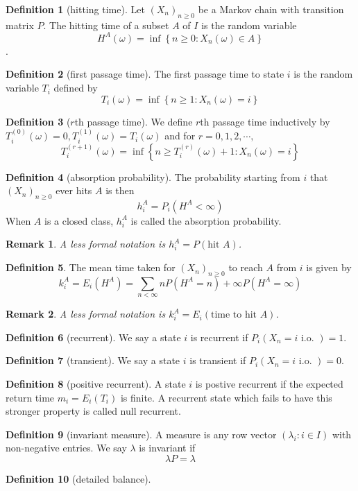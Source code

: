 \documentclass{article}
\newtheorem*{Rk}{Remark}
\theoremstyle{definition}
\newtheorem{Def}{Definition}[section]
\renewcommand{\geq}{\geqslant}
\newcommand{\<}{\left\langle}
\renewcommand{\>}{\right\rangle}
\begin{document}
\begin{Def}[hitting time]
    Let $(X_n)_{n\geq 0}$ be a Markov chain with transition matrix $P$. The hitting time of a subset $A$ of $I$ is the random
    variable \[H^A(\omega)=\inf \left\{n\geq 0:X_n(\omega)\in A\right\}\].
\end{Def}
\begin{Def}[first passage time]
    The first passage time to state $i$ is the random variable $T_i$ defined by \[T_i(\omega)=\inf\left\{n\geq 1:X_n(\omega)=i\right\}\]
\end{Def}
\begin{Def}[$r$th passage time]
    We define $r$th passage time inductively by 
    $T_i^{(0)}(\omega)=0,T_i^{(1)}(\omega)=T_i(\omega)$
    and for $r=0,1,2,\cdots,$
    \[T_i^{(r+1)}(\omega)=\inf\left\{n\geq T_i^{(r)}(\omega)+1:X_n(\omega)=i\right\}\]
\end{Def}


\begin{Def}[absorption probability]
    The probability starting from $i$ that $(X_n)_{n\geq 0}$ ever hits $A$ is then \[h_i^A=P_i(H^A<\infty)\]
    When $A$ is a closed class, $h_i^A$ is called the absorption probability.
\end{Def}
\begin{Rk}
A less formal notation is $h_i^A=P(\text{hit }A)$.
\end{Rk}
\begin{Def}
    The mean time taken for $(X_n)_{n\geq 0}$ to reach $A$ from $i$ is given by \[k_i^A=E_i(H^A)=\sum_{n<\infty}nP(H^A=n)+\infty P(H^A=\infty)\]
\end{Def}
\begin{Rk}
    A less formal notation is $k_i^A=E_i(\text{time to hit }A)$.
\end{Rk}


\begin{Def}[recurrent]
    We say a state $i$ is recurrent if $P_i(X_n=i\text{ i.o. })=1$.
\end{Def}
\begin{Def}[transient]
    We say a state $i$ is transient if $P_i(X_n=i\text{ i.o. })=0$.
\end{Def}
\begin{Def}[positive recurrent]
    A state $i$ is postive recurrent if the expected return time $m_i=E_i(T_i)$ is finite.
    A recurrent state which fails to have this stronger property is called null recurrent.
\end{Def}
\begin{Def}[invariant measure]
    A measure is any row vector $(\lambda_i:i\in I)$ with non-negative entries. We say $\lambda$ is invariant if \[\lambda P=\lambda\]
\end{Def}
\begin{Def}[detailed balance]
    
\end{Def}
\end{document}

